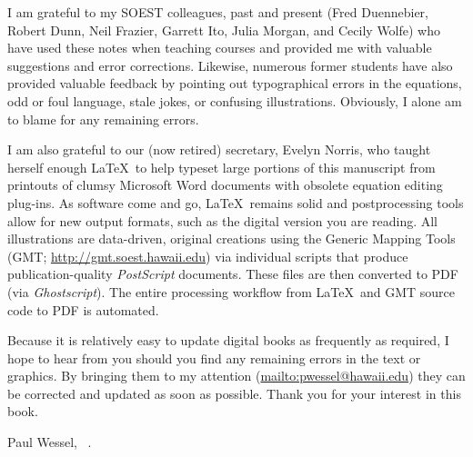 I am grateful to my SOEST colleagues, past and present (Fred Duennebier, Robert Dunn, Neil Frazier,
Garrett Ito, Julia Morgan, and Cecily Wolfe) who have used these notes when teaching
courses and provided me with valuable suggestions and error corrections.  Likewise, numerous former students have
also provided valuable feedback by pointing out typographical errors in the equations, odd or foul language,
stale jokes, or confusing illustrations.  Obviously, I alone am to blame for any remaining errors.

I am also grateful to our (now retired) secretary, Evelyn Norris,
who taught herself enough \LaTeX\ to help typeset large portions of this manuscript from printouts of clumsy Microsoft Word documents
with obsolete equation editing plug-ins.  As software come and go, \LaTeX\ remains solid and postprocessing tools allow
for new output formats, such as the digital version you are reading.  All illustrations are data-driven, original creations using the
Generic Mapping Tools (GMT; \url{http://gmt.soest.hawaii.edu}) via individual scripts that produce
publication-quality \emph{PostScript} documents.  These files are then converted to PDF (via \emph{Ghostscript}).  The entire
processing workflow from \LaTeX\ and GMT source code to PDF is automated.

Because it is relatively easy to update digital books as frequently as required, I hope to hear from you should you find any remaining errors
in the text or graphics.  By bringing them to my attention (\url{mailto:pwessel@hawaii.edu})
they can be corrected and updated as soon as possible.  Thank you for your interest in this book.

\vspace{2\baselineskip}
Paul Wessel, \DAmonth\ \DAyear.
